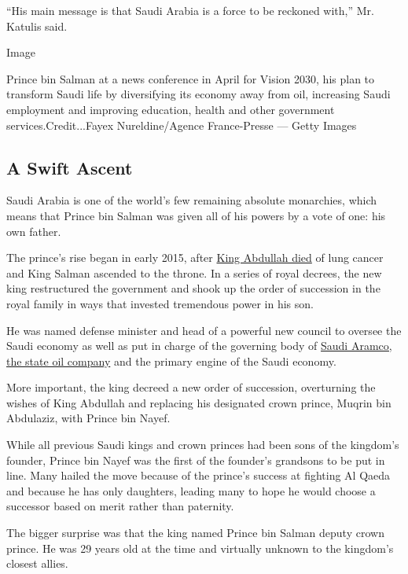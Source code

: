 ``His main message is that Saudi Arabia is a force to be reckoned
with,'' Mr. Katulis said.

Image

Prince bin Salman at a news conference in April for Vision 2030, his
plan to transform Saudi life by diversifying its economy away from oil,
increasing Saudi employment and improving education, health and other
government services.Credit...Fayex Nureldine/Agence France-Presse ---
Getty Images

\hypertarget{a-swift-ascent}{%
\subsection{A Swift Ascent}\label{a-swift-ascent}}

Saudi Arabia is one of the world's few remaining absolute monarchies,
which means that Prince bin Salman was given all of his powers by a vote
of one: his own father.

The prince's rise began in early 2015, after
\href{http://www.nytimes3xbfgragh.onion/2015/01/23/world/middleeast/king-abdullah-who-nudged-saudi-arabia-forward-dies-at-90.html}{King
Abdullah died} of lung cancer and King Salman ascended to the throne. In
a series of royal decrees, the new king restructured the government and
shook up the order of succession in the royal family in ways that
invested tremendous power in his son.

He was named defense minister and head of a powerful new council to
oversee the Saudi economy as well as put in charge of the governing body
of
\href{http://www.nytimes3xbfgragh.onion/2016/01/09/business/dealbook/saudi-aramco-ipo-prospect-reflects-kingdom-looking-beyond-oil.html}{Saudi
Aramco, the state oil company} and the primary engine of the Saudi
economy.

More important, the king decreed a new order of succession, overturning
the wishes of King Abdullah and replacing his designated crown prince,
Muqrin bin Abdulaziz, with Prince bin Nayef.

While all previous Saudi kings and crown princes had been sons of the
kingdom's founder, Prince bin Nayef was the first of the founder's
grandsons to be put in line. Many hailed the move because of the
prince's success at fighting Al Qaeda and because he has only daughters,
leading many to hope he would choose a successor based on merit rather
than paternity.

The bigger surprise was that the king named Prince bin Salman deputy
crown prince. He was 29 years old at the time and virtually unknown to
the kingdom's closest allies.

